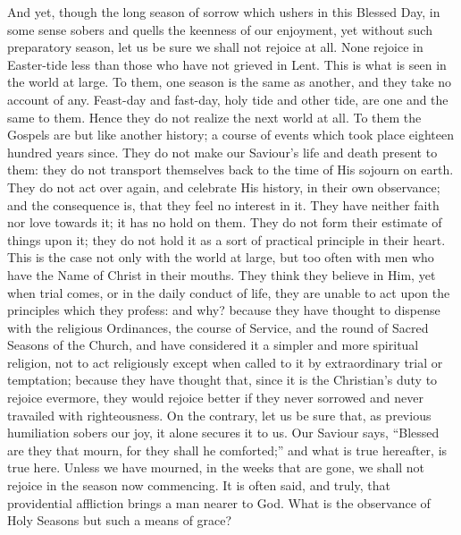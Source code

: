 And yet, though the long season of sorrow which ushers in this
Blessed Day, in some sense sobers and quells the keenness of our
enjoyment, yet without such preparatory season, let us be sure we
shall not rejoice at all. None rejoice in Easter-tide less than those
who have not grieved in Lent. This is what is seen in the world at
large. To them, one season is the same as another, and they take no
account of any. Feast-day and fast-day, holy tide and other tide, are
one and the same to them. Hence they do not realize the next world at
all. To them the Gospels are but like another history; a course of
events which took place eighteen hundred years since. They do not make
our Saviour's life and death present to them: they do not transport
themselves back to the time of His sojourn on earth. They do not act
over again, and celebrate His history, in their own observance; and
the consequence is, that they feel no interest in it. They have
neither faith nor love towards it; it has no hold on them. They do not
form their estimate of things upon it; they do not hold it as a sort
of practical principle in their heart. This is the case not only with
the world at large, but too often with men who have the Name of Christ
in their mouths. They think they believe in Him, yet when trial comes,
or in the daily conduct of life, they are unable to act upon the
principles which they profess: and why? because they have thought to
dispense with the religious Ordinances, the course of Service, and the
round of Sacred Seasons of the Church, and have considered it a
simpler and more spiritual religion, not to act religiously except
when called to it by extraordinary trial or temptation; because they
have thought that, since it is the Christian's duty to rejoice
evermore, they would rejoice better if they never sorrowed and never
travailed with righteousness. On the contrary, let us be sure that, as
previous humiliation sobers our joy, it alone secures it to us. Our
Saviour says, ``Blessed are they that mourn, for they shall he
comforted;'' and what is true hereafter, is true here. Unless we
have mourned, in the weeks that are gone, we shall not rejoice in the
season now commencing. It is often said, and truly, that providential
affliction brings a man nearer to God. What is the observance of Holy
Seasons but such a means of grace?

